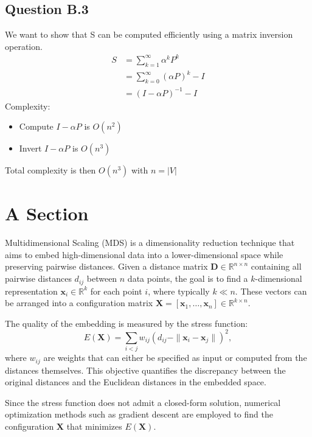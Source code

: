 \documentclass[a4paper]{scrartcl}
\begin{document}
\subsection*{Question B.3}
We want to show that S can be computed efficiently using a matrix inversion operation.
\begin{align*}
    S &= \sum_{k=1}^{\infty} \alpha^k P^k\\
    &= \sum_{k=0}^{\infty} (\alpha P)^k - I\\
    &= (I-\alpha P)^{-1} - I
\end{align*}
Complexity:
\begin{itemize}
    \item Compute $I-\alpha P$ is $O(n^2)$
    \item Invert $I-\alpha P$ is $O(n^3)$
\end{itemize}
Total complexity is then $O(n^3)$ with $n=|V|$

\section*{A Section}
Multidimensional Scaling (MDS) is a dimensionality reduction technique that aims to embed high-dimensional data into a lower-dimensional space while preserving pairwise distances. Given a distance matrix $\mathbf{D} \in \mathbb{R}^{n \times n}$ containing all pairwise distances $d_{ij}$ between $n$ data points, the goal is to find a $k$-dimensional representation $\mathbf{x}_i \in \mathbb{R}^k$ for each point $i$, where typically $k \ll n$. These vectors can be arranged into a configuration matrix $\mathbf{X} = [\mathbf{x}_1, \ldots, \mathbf{x}_n] \in \mathbb{R}^{k \times n}$.

The quality of the embedding is measured by the stress function:
\begin{equation}
E(\mathbf{X}) = \sum_{i<j} w_{ij} \left(d_{ij} - \|\mathbf{x}_i - \mathbf{x}_j\|\right)^2,
\end{equation}
where $w_{ij}$ are weights that can either be specified as input or computed from the distances themselves. This objective quantifies the discrepancy between the original distances and the Euclidean distances in the embedded space.

Since the stress function does not admit a closed-form solution, numerical optimization methods such as gradient descent are employed to find the configuration $\mathbf{X}$ that minimizes $E(\mathbf{X})$.
\end{document}

